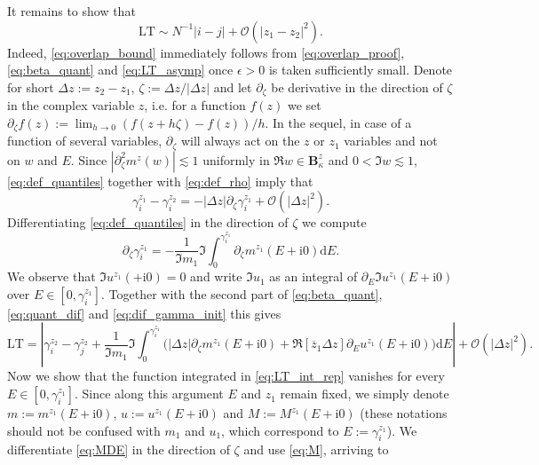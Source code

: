 \documentclass[10pt]{amsart}
\numberwithin{equation}{section}
\newcommand{\dif}{\mathrm{d}}
\newcommand{\ii}{\mathrm{i}}
\begin{document}
It remains to show that
\begin{equation}
\mathrm{LT}\sim N^{-1}|i-j|+\mathcal{O}(|z_1-z_2|^2).
\label{eq:LT_asymp}
\end{equation}
Indeed, \eqref{eq:overlap_bound} immediately follows from \eqref{eq:overlap_proof}, \eqref{eq:beta_quant} and \eqref{eq:LT_asymp} once $\epsilon>0$ is taken sufficiently small. Denote for short $\Delta z:=z_2-z_1$, $\zeta:=\Delta z/|\Delta z|$ and let $\partial_\zeta$ be derivative in the direction of $\zeta$ in the complex variable $z$, i.e. for a function $f(z)$ we set $\partial_\zeta f(z):=\lim_{h\to 0}(f(z+h\zeta)-f(z))/h$. In the sequel, in case of a function of several variables, $\partial_\zeta$ will always act on the $z$ or $z_1$ variables and not on $w$ and $E$. Since $|\partial_\zeta^2 m^z(w)|\lesssim 1$ uniformly in $\Re w\in\mathbf{B}_\kappa^z$ and $0<\Im w\lesssim 1$, \eqref{eq:def_quantiles} together with \eqref{eq:def_rho} imply that 
\begin{equation}
\gamma_i^{z_1}-\gamma_i^{z_2} = -|\Delta z|\partial_\zeta \gamma_i^{z_1}  + \mathcal{O}(|\Delta z|^2).
\label{eq:quant_dif}
\end{equation}
Differentiating \eqref{eq:def_quantiles} in the direction of $\zeta$ we compute
\begin{equation}
\partial_\zeta \gamma_i^{z_1} = - \frac{1}{\Im m_1} \Im \int_0^{\gamma_i^{z_1}}\partial_\zeta m^{z_1}(E+\ii 0)\dif E.
\label{eq:dif_gamma_init}
\end{equation}
We observe that $\Im u^{z_1}(+\ii 0)=0$ and write $\Im u_1$ as an integral of $\partial_E \Im u^{z_1}(E+\ii 0)$ over $E\in [0,\gamma_i^{z_1}]$. Together with the second part of \eqref{eq:beta_quant}, \eqref{eq:quant_dif} and \eqref{eq:dif_gamma_init} this gives
\begin{equation}
\mathrm{LT} = \left\vert \gamma_i^{z_2}-\gamma_j^{z_2} +\frac{1}{\Im m_1}\Im\int_0^{\gamma_i^{z_1}}\Big(|\Delta z|\partial_\zeta m^{z_1}(E+\ii 0) + \Re \left[\overline{z}_1\Delta z\right] \partial_E u^{z_1}(E+\ii 0)\Big)\dif E\right\vert + \mathcal{O}(|\Delta z|^2).
\label{eq:LT_int_rep}
\end{equation}
Now we show that the function integrated in \eqref{eq:LT_int_rep} vanishes for every $E\in [0,\gamma^{z_1}_i]$. Since along this argument $E$ and $z_1$ remain fixed, we simply denote $m:=m^{z_1}(E+\ii 0)$, $u:=u^{z_1}(E+\ii 0)$ and $M:=M^{z_1}(E+\ii 0)$ (these notations should not be confused with $m_1$ and $u_1$, which correspond to $E:=\gamma^{z_1}_i$).  We differentiate \eqref{eq:MDE} in the direction of $\zeta$ and use \eqref{eq:M}, arriving to
\end{document}
